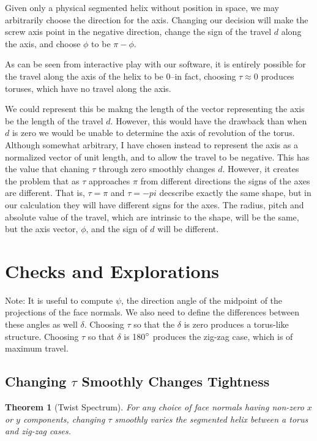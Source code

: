 \documentclass[11pt]{article}
\newtheorem{theorem}{Theorem}
\begin{document}
{Given only a physical segmented helix without position in space, we may arbitrarily choose the
direction for the axis. Changing our decision will make the screw axis point in the negative direction,
change the sign of the travel $d$ along the axis, and choose $\phi$ to be $\pi - \phi$.

As can be seen from interactive play with our software, it is entirely possible for the travel along
the axis of the helix to be $0$--in fact, choosing $\tau \approx 0$ produces toruses, which have no
travel along the axis.

We could represent this be makng the length of the vector representing the axis be the length of the
travel $d$. However, this would have the drawback than when $d$ is zero we would be unable to determine
the axis of revolution of the torus. Although somewhat arbitrary, I have chosen instead to represent the
axis as a normalized vector of unit length, and to allow the travel to be negative. This has the value that
chaning $\tau$ through zero smoothly changes $d$. However, it creates the problem that as $\tau$ approaches
$\pi$ from different directions the signs of the axes are different. That is, $\tau = \pi$ and $\tau = -pi$ decscribe exactly
the same shape, but in our calculation they will have different signs for the axes. The radius, pitch and
absolute value of the travel,
which are intrinsic to the shape, will be the same, but the axis vector, $\phi$, and the sign of $d$ will be different.

\section{Checks and Explorations}

Note: It is useful to compute $\psi$, the direction angle of
the midpoint of the projections of the face normals.
We also need to define the differences between these angles
as well $\delta$.
Choosing $\tau$ so that the $\delta$ is zero produces a torus-like
structure. Choosing $\tau$ so that $\delta$ is 180$\degree$ produces
the zig-zag case, which is of maximum travel.


\subsection{Changing $\tau$ Smoothly Changes Tightness}

\begin{theorem}[Twist Spectrum]
  For any choice of face normals having non-zero $x$ or $y$ components, changing $\tau$ smoothly varies the segmented helix
  between a torus and zig-zag cases.
  \end{theorem}

}
\end{document}
